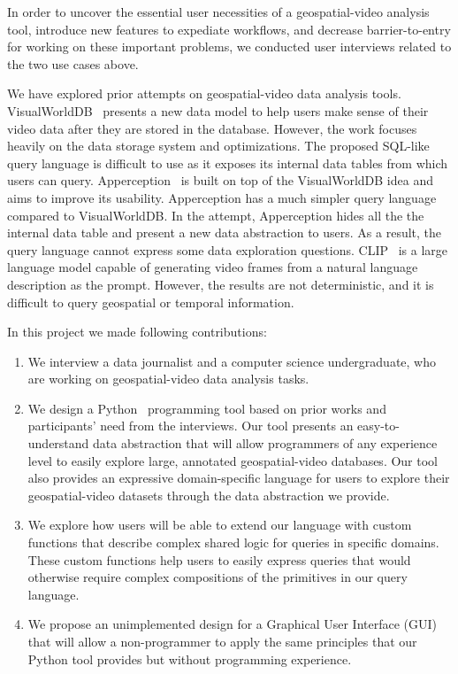 In order to uncover the essential user necessities of a geospatial-video analysis tool, introduce new features to expediate workflows, and decrease barrier-to-entry for working on these important problems, we conducted user interviews related to the two use cases above.

We have explored prior attempts on geospatial-video data analysis tools.
VisualWorldDB~\cite{haynes:visualworlddb} presents a new data model to help users make sense of their video data after they are stored in the database.
However, the work focuses heavily on the data storage system and optimizations.
The proposed SQL-like query language is difficult to use as it exposes its internal data tables from which users can query.
Apperception~\cite{ge:apperception} is built on top of the VisualWorldDB idea and aims to improve its usability.
Apperception has a much simpler query language compared to VisualWorldDB.
In the attempt, Apperception hides all the the internal data table and present a new data abstraction to users.
As a result, the query language cannot express some data exploration questions.
CLIP~\cite{radford:clip} is a large language model capable of generating video frames from a natural language description as the prompt. 
However, the results are not deterministic, and it is difficult to query geospatial or temporal information.

In this project we made following contributions:
\begin{enumerate}
    \item
    We interview a data journalist and a computer science undergraduate,
    who are working on geospatial-video data analysis tasks.
    \item
    We design a Python~\cite{van:python} programming tool based on prior works and participants' need from the interviews.
    Our tool presents an easy-to-understand data abstraction that will allow programmers of any experience level to easily explore large, annotated geospatial-video databases. Our tool also provides an expressive domain-specific language for users to explore their geospatial-video datasets through the data abstraction we provide.
    \item
    We explore how users will be able to extend our language with custom functions that describe complex shared logic for queries in specific domains.
    These custom functions help users to easily express queries that would otherwise require complex compositions of the primitives in our query language.
    \item
    We propose an unimplemented design for a Graphical User Interface (GUI) that will allow a non-programmer to apply the same principles that our Python tool provides but without programming experience.
\end{enumerate}
